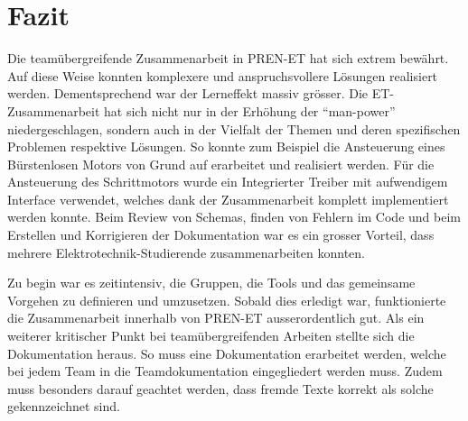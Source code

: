 \section{Fazit}
    Die teamübergreifende Zusammenarbeit in PREN-ET hat sich extrem bewährt. 
    Auf diese Weise konnten komplexere und anspruchsvollere Lösungen 
    realisiert werden. Dementsprechend war der Lerneffekt massiv grösser. Die 
    ET-Zusammenarbeit hat sich nicht nur in der Erhöhung der 
    \enquote{man-power} niedergeschlagen, sondern auch in der Vielfalt der 
    Themen und deren spezifischen Problemen respektive Lösungen. So konnte zum 
    Beispiel die Ansteuerung eines Bürstenlosen Motors von Grund auf 
    erarbeitet und realisiert werden. Für die Ansteuerung des Schrittmotors 
    wurde ein Integrierter Treiber mit aufwendigem Interface verwendet, 
    welches dank der Zusammenarbeit komplett implementiert werden konnte. Beim 
    Review von Schemas, finden von Fehlern im Code und beim Erstellen und 
    Korrigieren der Dokumentation war es ein grosser Vorteil, dass mehrere 
    Elektrotechnik-Studierende zusammenarbeiten konnten. 
    
    \noindent
    Zu begin war es zeitintensiv, die Gruppen, die Tools und das gemeinsame 
    Vorgehen zu definieren und umzusetzen. Sobald dies erledigt war, 
    funktionierte die Zusammenarbeit innerhalb von PREN-ET ausserordentlich 
    gut. Als ein weiterer kritischer Punkt bei teamübergreifenden Arbeiten 
    stellte sich die Dokumentation heraus. So muss eine Dokumentation 
    erarbeitet werden, welche bei jedem Team in die Teamdokumentation 
    eingegliedert werden muss. Zudem muss besonders darauf geachtet werden, 
    dass fremde Texte korrekt als solche gekennzeichnet sind. 
